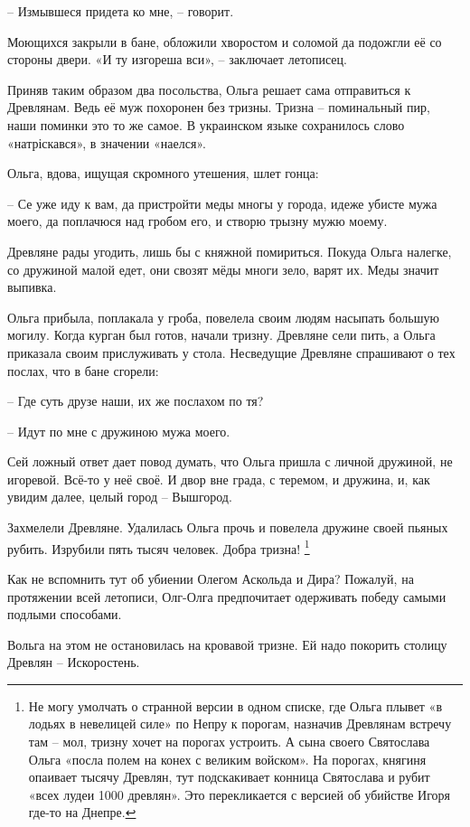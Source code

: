  – Измывшеся придета ко мне, – говорит.

Моющихся закрыли в бане, обложили хворостом и соломой да подожгли её со стороны двери. «И ту изгореша вси», – заключает летописец. 

Приняв таким образом два посольства, Ольга решает сама отправиться к Древлянам. Ведь её муж похоронен без тризны. Тризна – поминальный пир, наши поминки это то же самое. В украинском языке сохранилось слово «натріскався», в значении «наелся».

Ольга, вдова, ищущая скромного утешения, шлет гонца:

 – Се уже иду к вам, да пристройти меды многы у города, идеже убисте мужа моего, да поплачюся над гробом его, и створю трызну мужю моему.

Древляне рады угодить, лишь бы с княжной помириться. Покуда Ольга налегке, со дружиной малой едет, они свозят мёды многи зело, варят их. Меды значит выпивка.

Ольга прибыла, поплакала у гроба, повелела своим людям насыпать большую могилу. Когда курган был готов, начали тризну. Древляне сели пить, а Ольга приказала своим прислуживать у стола. Несведущие Древляне спрашивают о тех послах, что в бане сгорели:

 – Где суть друзе наши, их же послахом по тя?

 – Идут по мне с дружиною мужа моего.

Сей ложный ответ дает повод думать, что Ольга пришла с личной дружиной, не игоревой. Всё-то у неё своё. И двор вне града, с теремом, и дружина, и, как увидим далее, целый город – Вышгород.

Захмелели Древляне. Удалилась Ольга прочь и повелела дружине своей пьяных рубить. Изрубили пять тысяч человек. Добра тризна!
\footnote{Не могу умолчать о странной версии в одном списке, где Ольга плывет «в лодьях в невелицей силе» по Непру к порогам, назначив Древлянам встречу там – мол, тризну хочет на порогах устроить. А сына своего Святослава Ольга «посла полем на конех с великим войском». На порогах, княгиня опаивает тысячу Древлян, тут подскакивает конница Святослава и рубит «всех лудеи 1000 древлян». Это перекликается с версией об убийстве Игоря где-то на Днепре.}

Как не вспомнить тут об убиении Олегом Аскольда и Дира? Пожалуй, на протяжении всей летописи, Олг-Олга предпочитает одерживать победу самыми подлыми способами.

Вольга на этом не остановилась на кровавой тризне. Ей надо покорить столицу Древлян – Искоростень.

